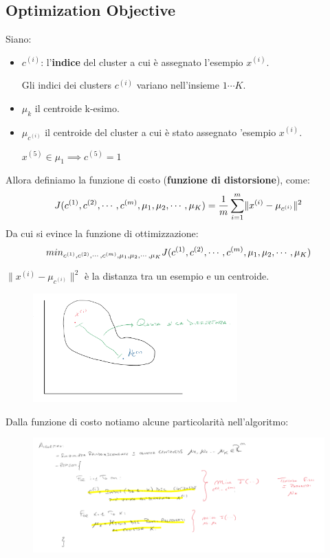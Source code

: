 \subsection{Optimization Objective}
\begin{definizione}
  Siano:
  \begin{itemize}
      \item $c^{(i)}$: l'\textbf{indice} del cluster a cui è assegnato l'esempio $x^{(i)}$. 
      \begin{nota}
      Gli indici dei clusters $c^{(i)}$ variano nell'insieme $1 \cdots K$.
      \end{nota}
      \item $\mu_k$ il centroide k-esimo.
      \item $\mu_{c^{(i)}}$ il centroide del cluster a cui è stato assegnato 'esempio $x^{(i)}$.
      \begin{nota}
      $x^{(5)} \in \mu_1 \implies c^{(5)} = 1$
      \end{nota}
  \end{itemize}
  Allora definiamo la funzione di costo (\textbf{funzione di distorsione}), come:
  \[J(c^{(1)}, c^{(2)}, \cdots, c^{(m)}, \mu_1, \mu_2, \cdots, \mu_K) = {1 \over m} \sum_{i=1}^m \lVert x^{(i)} - \mu_{c^{(i)}} \rVert^2\]
  Da cui si evince la funzione di ottimizzazione:
  \[min_{c^{(1)}, c^{(2)}, \cdots, c^{(m)},\\ \mu_1, \mu_2, \cdots, \mu_K} J(c^{(1)}, c^{(2)}, \cdots, c^{(m)}, \mu_1, \mu_2, \cdots, \mu_K)\]
\end{definizione}
\begin{nota}
$\lVert x^{(i)} - \mu_{c^{(i)}} \rVert^2$ è la distanza tra un esempio e un centroide.
 \begin{figure}[H]
    \centering
    \includegraphics[width=0.7\textwidth]{img/kmeans6.PNG}
\end{figure}
\end{nota}
Dalla funzione di costo notiamo alcune particolarità nell'algoritmo:
 \begin{figure}[H]
    \centering
    \includegraphics[width=1\textwidth]{img/kmeans14.PNG}
\end{figure}
